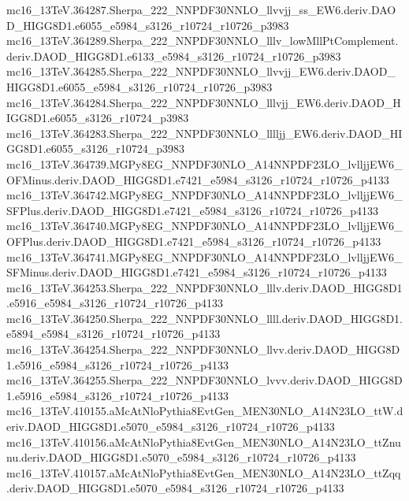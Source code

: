 \begin{scriptsize}
mc16\_13TeV.364287.Sherpa\_222\_NNPDF30NNLO\_llvvjj\_ss\_EW6.deriv.DAOD\_HIGG8D1.e6055\_e5984\_s3126\_r10724\_r10726\_p3983
mc16\_13TeV.364289.Sherpa\_222\_NNPDF30NNLO\_lllv\_lowMllPtComplement.deriv.DAOD\_HIGG8D1.e6133\_e5984\_s3126\_r10724\_r10726\_p3983 \\
mc16\_13TeV.364285.Sherpa\_222\_NNPDF30NNLO\_llvvjj\_EW6.deriv.DAOD\_HIGG8D1.e6055\_e5984\_s3126\_r10724\_r10726\_p3983 \\
mc16\_13TeV.364284.Sherpa\_222\_NNPDF30NNLO\_lllvjj\_EW6.deriv.DAOD\_HIGG8D1.e6055\_s3126\_r10724\_p3983 \\
mc16\_13TeV.364283.Sherpa\_222\_NNPDF30NNLO\_lllljj\_EW6.deriv.DAOD\_HIGG8D1.e6055\_s3126\_r10724\_p3983 \\
mc16\_13TeV.364739.MGPy8EG\_NNPDF30NLO\_A14NNPDF23LO\_lvlljjEW6\_OFMinus.deriv.DAOD\_HIGG8D1.e7421\_e5984\_s3126\_r10724\_r10726\_p4133 \\
mc16\_13TeV.364742.MGPy8EG\_NNPDF30NLO\_A14NNPDF23LO\_lvlljjEW6\_SFPlus.deriv.DAOD\_HIGG8D1.e7421\_e5984\_s3126\_r10724\_r10726\_p4133 \\
mc16\_13TeV.364740.MGPy8EG\_NNPDF30NLO\_A14NNPDF23LO\_lvlljjEW6\_OFPlus.deriv.DAOD\_HIGG8D1.e7421\_e5984\_s3126\_r10724\_r10726\_p4133 \\
mc16\_13TeV.364741.MGPy8EG\_NNPDF30NLO\_A14NNPDF23LO\_lvlljjEW6\_SFMinus.deriv.DAOD\_HIGG8D1.e7421\_e5984\_s3126\_r10724\_r10726\_p4133 \\
mc16\_13TeV.364253.Sherpa\_222\_NNPDF30NNLO\_lllv.deriv.DAOD\_HIGG8D1.e5916\_e5984\_s3126\_r10724\_r10726\_p4133 \\
mc16\_13TeV.364250.Sherpa\_222\_NNPDF30NNLO\_llll.deriv.DAOD\_HIGG8D1.e5894\_e5984\_s3126\_r10724\_r10726\_p4133 \\
mc16\_13TeV.364254.Sherpa\_222\_NNPDF30NNLO\_llvv.deriv.DAOD\_HIGG8D1.e5916\_e5984\_s3126\_r10724\_r10726\_p4133 \\
mc16\_13TeV.364255.Sherpa\_222\_NNPDF30NNLO\_lvvv.deriv.DAOD\_HIGG8D1.e5916\_e5984\_s3126\_r10724\_r10726\_p4133 \\
mc16\_13TeV.410155.aMcAtNloPythia8EvtGen\_MEN30NLO\_A14N23LO\_ttW.deriv.DAOD\_HIGG8D1.e5070\_e5984\_s3126\_r10724\_r10726\_p4133 \\
mc16\_13TeV.410156.aMcAtNloPythia8EvtGen\_MEN30NLO\_A14N23LO\_ttZnunu.deriv.DAOD\_HIGG8D1.e5070\_e5984\_s3126\_r10724\_r10726\_p4133 \\
mc16\_13TeV.410157.aMcAtNloPythia8EvtGen\_MEN30NLO\_A14N23LO\_ttZqq.deriv.DAOD\_HIGG8D1.e5070\_e5984\_s3126\_r10724\_r10726\_p4133 \\

\end{scriptsize}
